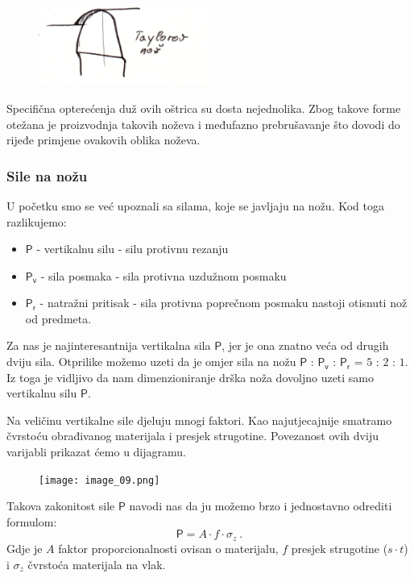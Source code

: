 \documentclass[a4paper,12pt]{article}
\numberwithin{figure}{section}
\begin{document}
\begin{figure}[!h]
\includegraphics[width=0.5\textwidth]{image_08-2.png}
\end{figure}
\FloatBarrier
\noindent Specifična opterećenja duž ovih oštrica su dosta nejednolika. Zbog takove forme otežana je proizvodnja takovih noževa i međufazno prebrušavanje što dovodi do rijeđe primjene ovakovih oblika noževa. 
\subsubsection*{Sile na nožu}
U početku smo se već upoznali sa silama, koje se javljaju na nožu. Kod toga razlikujemo:
\begin{itemize}
\item $\mathsf{P}$ - vertikalnu silu - silu protivnu rezanju
\item $\mathsf{P_{v}}$ - sila posmaka - sila protivna uzdužnom posmaku
\item $\mathsf{P_{r}}$ - natražni pritisak - sila protivna poprečnom posmaku nastoji otisnuti nož od predmeta.
\end{itemize}
\par
Za nas je najinteresantnija vertikalna sila $\mathsf{P}$, jer je ona znatno veća od drugih dviju sila. Otprilike možemo uzeti da je omjer sila na nožu $\mathsf{P}$ : $\mathsf{P_{v}}$ : $\mathsf{P_{r}}$ = $5$ : $2$ : $1$. Iz toga je vidljivo da nam dimenzioniranje drška noža dovoljno uzeti samo vertikalnu silu $\mathsf{P}$. \par
Na veličinu vertikalne sile djeluju mnogi faktori. Kao najutjecajnije smatramo čvrstoću obrađivanog materijala i presjek strugotine. Povezanost ovih dviju varijabli prikazat ćemo u dijagramu.
\begin{figure}[!h]
\texttt{[image: image\_09.png]}
\end{figure}
\FloatBarrier
Takova zakonitost sile $\mathsf{P}$ navodi nas da ju možemo brzo i jednostavno odrediti formulom:
\begin{equation}
\mathsf{P} = A \cdot f \cdot \sigma_{z}\:.
\end{equation}
Gdje je $A$ faktor proporcionalnosti ovisan o materijalu, $f$ presjek strugotine ($s\cdot t$)  i $\sigma_{z}$ čvrstoća materijala na vlak. \par
\end{document}
